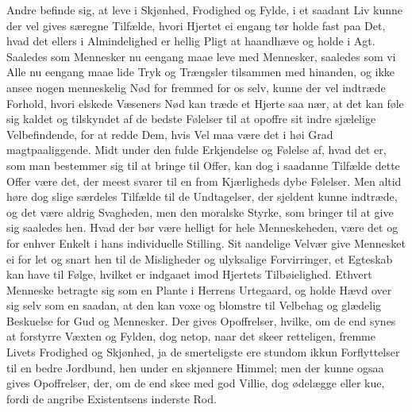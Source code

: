 \documentclass[12pt,a4paper]{book}
\newcommand{\apage}[1]{\marginnote{\footnotesize\textit{[#1]}}}
\begin{document}
Andre befinde sig, at leve i Skjønhed, Frodighed og Fylde, i et saadant
Liv kunne der vel gives særegne Tilfælde, hvori Hjertet ei engang tør
holde fast paa Det, hvad det ellers i Almindelighed er hellig Pligt at
haandhæve og holde i Agt. Saaledes som Mennesker nu eengang maae leve med
Mennesker, saaledes som vi Alle nu eengang maae lide Tryk og Trængsler
tilsammen med hinanden, og ikke ansee nogen menneskelig Nød for fremmed
for os selv, kunne der vel indtræde Forhold, hvori elskede Væseners Nød
kan træde et Hjerte saa nær, at det kan føle sig kaldet og tilskyndet af
de bedste Følelser til at opoffre sit indre sjælelige \apage{154} Velbefindende, for
at redde Dem, hvis Vel maa være det i høi Grad magtpaaliggende. Midt
under den fulde Erkjendelse og Følelse af, hvad det er, som man
bestemmer sig til at bringe til Offer, kan dog i saadanne Tilfælde dette
Offer være det, der meest svarer til en from Kjærligheds dybe Følelser.
Men altid høre dog slige særdeles Tilfælde til de Undtagelser, der
sjeldent kunne indtræde, og det være aldrig Svagheden, men den moralske
Styrke, som bringer til at give sig saaledes hen. Hvad der bør være
helligt for hele Menneskeheden, være det og for enhver Enkelt i hans
individuelle Stilling. Sit aandelige Velvær give Mennesket ei for let og
snart hen til de Misligheder og ulyksalige Forvirringer, et Egteskab kan
have til Følge, hvilket er indgaaet imod Hjertets Tilbøielighed. Ethvert
Menneske betragte sig som en Plante i Herrens Urtegaard, og holde Hævd
over sig selv som en saadan, at den kan voxe og blomstre til Velbehag og
glædelig Beskuelse for Gud og Mennesker. Der gives Opoffrelser, hvilke,
om de end synes at forstyrre Væxten og Fylden, dog netop, naar det skeer
retteligen, fremme Livets Frodighed og Skjønhed, ja de smerteligste ere
stundom ikkun Forflyttelser til en bedre Jordbund, hen under en skjønnere
Himmel; men der kunne ogsaa gives Opoffrelser, der, om de end skee med
god Villie, dog ødelægge eller kue, fordi de angribe Existentsens inderste
Rod.
\end{document}
